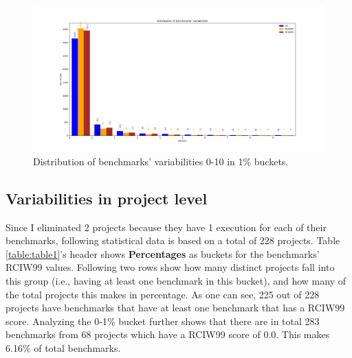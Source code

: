 \documentclass{seal_thesis}
\begin{document}
\begin{figure}[H]
	\centering
	\includegraphics[width=\linewidth]{benchmarks0-10}
	\caption{Distribution of benchmarks' variabilities 0-10 in 1\% buckets.}
	\label{fig:benchmark0-10}
\end{figure}

\subsection{Variabilities in project level}

Since I eliminated 2 projects because they have 1 execution for each of their benchmarks, following statistical data is based on a total of 228 projects. Table \ref{table:table1}'s header shows \textbf{Percentages} as buckets for the benchmarks' RCIW99 values. Following two rows show how many distinct projects fall into this group (i.e., having at least one benchmark in this bucket), and how many of the total projects this makes in percentage. As one can see, 225 out of 228 projects have benchmarks that have at least one benchmark that has a RCIW99 score. Analyzing the 0-1\% bucket further shows that there are in total 283 benchmarks from 68 projects which have a RCIW99 score of 0.0. This makes 6.16\% of total benchmarks.
\end{document}
